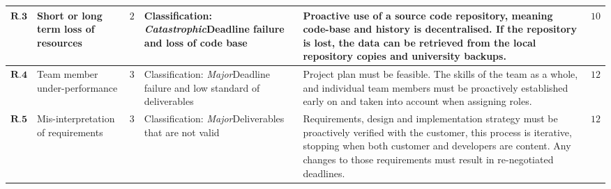 \begin{longtable}[H]{| p{0.6cm} | p{2cm} | p{0.3cm} | p{2.6cm} | p{8.1cm} | p{0.7cm} |}
   $ \textbf{R.3}   $ & Short or long term loss of resources             & $2$ & Classification: \newline\textit{Catastrophic}\newline Deadline failure and loss of code base              
    & Proactive use of a source code repository, meaning code-base and history is decentralised. If the repository is lost, the data can be retrieved from the local repository copies and university backups.                                                                                                                                                                                                                                                                                                        
    & $10$    \\ \hline
     $ \textbf{R.4} $    & Team member under-performance                    & $3$         & Classification: \newline\textit{Major}\newline Deadline failure and low standard  of deliverables            
    & Project plan must be feasible. The skills of the team as a whole, and individual team members must be proactively established early on and taken into account when assigning roles.                                                                                                                                                                                                                                                                                                                                                              
    & $12$   \\ \hline
   $ \textbf{R.5}  $   & Mis-interpretation of requirements                & $3$        & Classification: \newline\textit{Major}\newline Deliverables that are not valid                                        & 
    Requirements, design and implementation strategy must be proactively verified with the customer, this process is iterative, stopping when both customer and developers are content. Any changes to those requirements must result in re-negotiated deadlines.                                                                                                                                                                                                                                                                                    
    & $12$    \\ \hline

\end{longtable}
